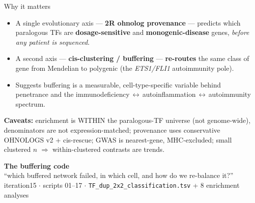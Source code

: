 \documentclass[aspectratio=169,11pt]{beamer}
\newcommand{\cat}[2]{\textcolor{#1}{\textbf{#2}}}
\begin{document}
\begin{frame}{Why it matters}
\begin{itemize}
  \item A single evolutionary axis --- \cat{ohnolog}{2R ohnolog provenance} --- predicts which paralogous TFs are \textbf{dosage-sensitive} and \textbf{monogenic-disease} genes, \emph{before any patient is sequenced}.
  \item A second axis --- \cat{cisohno}{cis-clustering / buffering} --- \textbf{re-routes} the same class of gene from Mendelian to polygenic (the \textit{ETS1/FLI1} autoimmunity pole).
  \item Suggests buffering is a measurable, cell-type-specific variable behind penetrance and the immunodeficiency\,$\leftrightarrow$\,autoinflammation\,$\leftrightarrow$\,autoimmunity spectrum.
\end{itemize}
\vspace{0.6em}
\footnotesize\textbf{Caveats:} enrichment is WITHIN the paralogous-TF universe (not genome-wide), denominators are not expression-matched; provenance uses conservative OHNOLOGS v2 + cis-rescue; GWAS is nearest-gene, MHC-excluded; small clustered $n$ $\Rightarrow$ within-clustered contrasts are trends.
\end{frame}

{
\begin{frame}[plain]
\vfill
\begin{center}
{\LARGE\bfseries\color{ohnolog} The buffering code}\\[0.6em]
{\large ``which buffered network failed, in which cell, and how do we re-balance it?''}\\[1.2em]
{\footnotesize\color{gray} iteration15 $\cdot$ scripts 01--17 $\cdot$ \texttt{TF\_dup\_2x2\_classification.tsv} + 8 enrichment analyses}
\end{center}
\vfill
\end{frame}}
\end{document}
